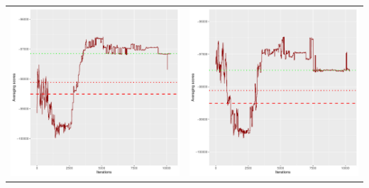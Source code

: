 \documentclass[]{scrartcl}
\begin{document}
\begin{table}[h!]
\begin{tabular}{cc}
\includegraphics[scale = 0.4]{./figs/hepar2/v3/25/avgBoundsEvolution-10352.pdf} & 
\includegraphics[scale = 0.4]{./figs/hepar2/v3/50/avgBoundsEvolution-10352.pdf} \\

\end{tabular}
\end{table}
\end{document}
